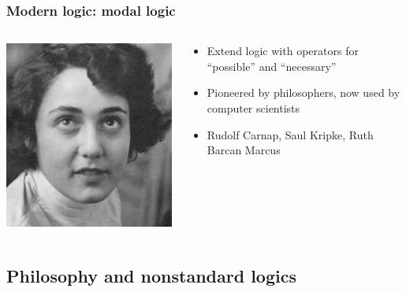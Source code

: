 \begin{frame}
  \frametitle{Modern logic: modal logic}

  \begin{columns}
    \begin{column}{.5\textwidth}
      \includegraphics[height=.8\textheight]{../assets/barcan}
    \end{column}
    \begin{column}{.5\textwidth}
      \begin{itemize}[<+->]
        \item Extend logic with operators for ``possible'' and ``necessary''
        \item Pioneered by philosophers, now used by computer scientists
        \item Rudolf Carnap, Saul Kripke, Ruth Barcan Marcus
      \end{itemize}
    \end{column}
  \end{columns}
\end{frame}

\subsection{Philosophy and nonstandard logics}


